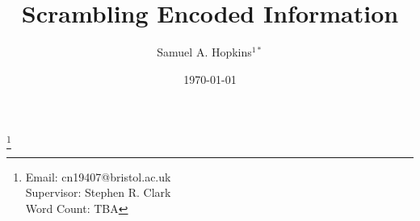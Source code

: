 \documentclass{revtex4-2}
\begin{document}
\title{Scrambling Encoded Information}

\author{Samuel A. Hopkins$^{1*}$}
\date{\today}
\thanks{Email: cn19407@bristol.ac.uk\\
Supervisor: Stephen R. Clark\\
Word Count: TBA
}

\maketitle

\clearpage
\tableofcontents
\clearpage









\end{document}
